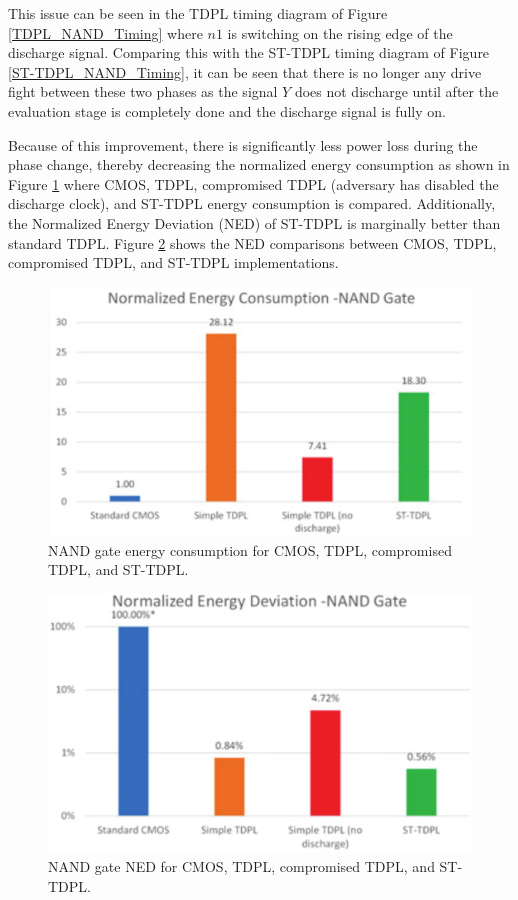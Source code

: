 \documentclass[conference, 12pt]{IEEEtran}
\newcommand{\x}{1}						%
\begin{document}
			This issue can be seen in the TDPL timing diagram of Figure \ref{TDPL_NAND_Timing} where $n1$ is switching on the rising edge of the discharge signal. Comparing this with the ST-TDPL timing diagram of Figure \ref{ST-TDPL_NAND_Timing}, it can be seen that there is no longer any drive fight between these two phases as the signal $Y$ does not discharge until after the evaluation stage is completely done and the discharge signal is fully on.

			Because of this improvement, there is significantly less power loss during the phase change, thereby decreasing the normalized energy consumption as shown in Figure \ref{ST-TDPL_Energy} where CMOS, TDPL, compromised TDPL (adversary has disabled the discharge clock), and ST-TDPL energy consumption is compared. Additionally, the Normalized Energy Deviation (NED) of ST-TDPL is marginally better than standard TDPL. Figure \ref{ST-TDPL_NED} shows the NED comparisons between CMOS, TDPL, compromised TDPL, and ST-TDPL implementations.

			\begin{figure}[tbp]
				\centering
				\includegraphics[width=\x\linewidth]{ReportFiles/ST-TDPL_Energy.png}
				\caption{NAND gate energy consumption for CMOS, TDPL, compromised TDPL, and ST-TDPL.\cite{b2}}
				\label{ST-TDPL_Energy}
			\end{figure}

			\begin{figure}[tbp]
				\centering
				\includegraphics[width=\x\linewidth]{ReportFiles/ST-TDPL_NED.png}
				\caption{NAND gate NED for CMOS, TDPL, compromised TDPL, and ST-TDPL.\cite{b2}}
				\label{ST-TDPL_NED}
			\end{figure}
\end{document}
